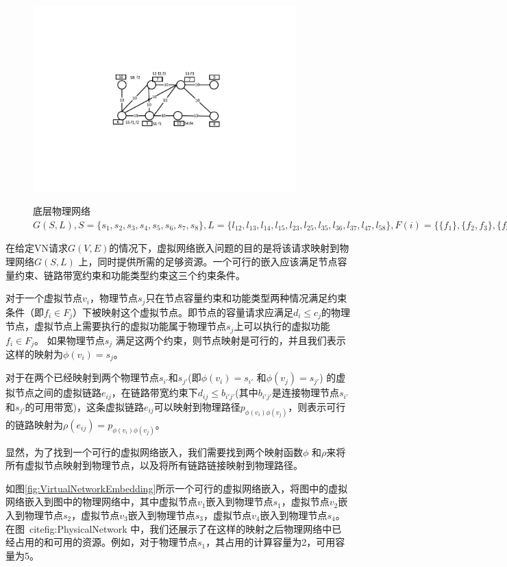 \begin{figure}
\centering
\includegraphics[width=4in]{figures/PhysicalNetwork}\\
\caption{底层物理网络$G(S,L), S=\{s_1,s_2,s_3,s_4,s_5,s_6,s_7,s_8\}, L=\{l_{12},l_{13},l_{14},l_{15},l_{23},l_{25},l_{35},l_{36},l_{37},l_{47},l_{58}\}, F(i)=\{\{f_1\},\{f_2,f_3\},\{f_3\},\{f_4\},\{f_1,f_2\},\{f_1,f_4\},\{f_2,f_3\},\{f_2\}\}, c_i=\{5,7,7,10,6,9,8,10\}, b_{ij}=\{10,10,10,10,10,10,10,10,10,10,10\}$}\label{fig:PhysicalNetwork}
\end{figure}

在给定VN请求$G (V,E)$的情况下，虚拟网络嵌入问题的目的是将该请求映射到物理网络$G (S,L)$ 上，同时提供所需的足够资源。一个可行的嵌入应该满足节点容量约束、链路带宽约束和功能类型约束这三个约束条件。

对于一个虚拟节点$v_i$，物理节点$s_j$只在节点容量约束和功能类型两种情况满足约束条件（即${f_i} \in {F_j}$）下被映射这个虚拟节点。即节点的容量请求应满足$d_i\leq c_j$的物理节点，虚拟节点上需要执行的虚拟功能属于物理节点$s_j$上可以执行的虚拟功能${f_i} \in {F_j}$。 如果物理节点$s_j$ 满足这两个约束，则节点映射是可行的，并且我们表示这样的映射为$\phi ({v_i}) = {s_j}$。

对于在两个已经映射到两个物理节点$s_{i'}$和$s_{j'}$(即$\phi({v_i}) = {s_{i'}}$ 和$\phi({v_j}) = {s_{j'}}$) 的虚拟节点之间的虚拟链路$e_{ij}$，在链路带宽约束下$d_{ij}\leq b_{i'j'}$(其中$b_{i'j'}$是连接物理节点$s_{i'}$ 和$s_{j'}$的可用带宽)，这条虚拟链路$e_{ij}$可以映射到物理路径$p_{\phi({v_i}) \phi({v_j})}$，则表示可行的链路映射为$\rho(e_{ij}) = p_{\phi({v_i}) \phi({v_j})}$。

显然，为了找到一个可行的虚拟网络嵌入，我们需要找到两个映射函数$\phi$ 和$\rho$来将所有虚拟节点映射到物理节点，以及将所有链路链接映射到物理路径。

如图\ref{fig:VirtualNetworkEmbedding}所示一个可行的虚拟网络嵌入，将图\cite{fig:VirtualNetworkRequest}中的虚拟网络嵌入到图\cite{fig:PhysicalNetwork}中的物理网络中，其中虚拟节点$v_1$嵌入到物理节点$s_1$，虚拟节点$v_2$嵌入到物理节点$s_2$，虚拟节点$v_3$嵌入到物理节点$s_3$，虚拟节点$v_4$嵌入到物理节点$s_4$。在图\ cite{fig:PhysicalNetwork} 中，我们还展示了在这样的映射之后物理网络中已经占用的和可用的资源。例如，对于物理节点$s_1$，其占用的计算容量为2，可用容量为5。

